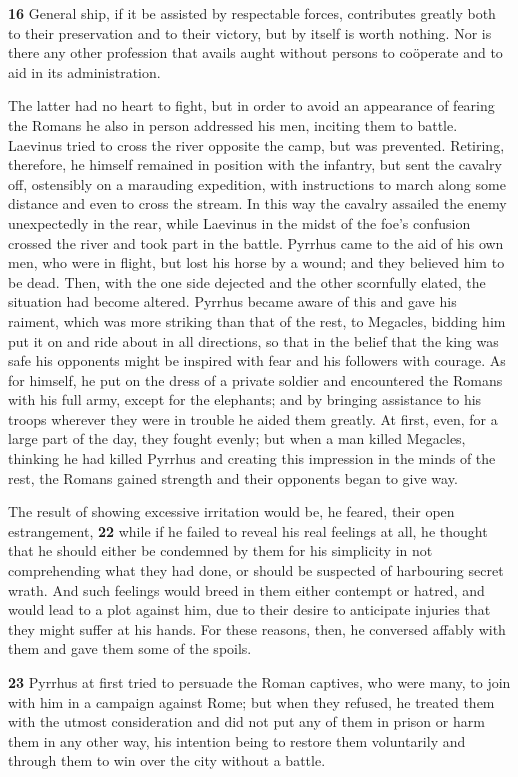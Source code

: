 \textbf{16} General ­ship, if it be assisted by respectable forces, contributes greatly both to their preservation and to their victory, but by itself is worth nothing. Nor is there any other profession that avails aught without persons to coöperate and to aid in its administration.

The latter had no heart to fight, but in order to avoid an appearance of fearing the Romans he also in person addressed his men, inciting them to battle. Laevinus tried to cross the river opposite the camp, but was prevented. Retiring, therefore, he himself remained in position with the infantry, but sent the cavalry off, ostensibly on a marauding expedition, with instructions to march along some distance and even to cross the stream. In this way the cavalry assailed the enemy unexpectedly in the rear, while Laevinus in the midst of the foe's confusion crossed the river and took part in the battle. Pyrrhus came to the aid of his own men, who were in flight, but lost his horse by a wound; and they believed him to be dead. Then, with the one side dejected and the other scornfully elated, the situation had become altered. Pyrrhus became aware of this and gave his raiment, which was more striking than that of the rest, to Megacles, bidding him put it on and ride about in all directions, so that in the belief that the king was safe his opponents might be inspired with fear and his followers with courage. As for himself, he put on the dress of a private soldier and encountered the Romans with his full army, except for the elephants; and by bringing assistance to his troops wherever they were in trouble he aided them greatly. At first, even, for a large part of the day, they fought evenly; but when a man killed Megacles, thinking he had killed Pyrrhus and creating this impression in the minds of the rest, the Romans gained strength and their opponents began to give way.

The result of showing excessive irritation would be, he feared, their open estrangement, \textbf{22} while if he failed to reveal his real feelings at all, he thought that he should either be condemned by them for his simplicity in not comprehending what they had done, or should be suspected of harbouring secret wrath. And such feelings would breed in them either contempt or hatred, and would lead to a plot against him, due to their desire to anticipate injuries that they might suffer at his hands. For these reasons, then, he conversed affably with them and gave them some of the spoils.

\textbf{23} Pyrrhus at first tried to persuade the Roman captives, who were many, to join with him in a campaign against Rome; but when they refused, he treated them with the utmost consideration and did not put any of them in prison or harm them in any other way, his intention being to restore them voluntarily and through them to win over the city without a battle.

